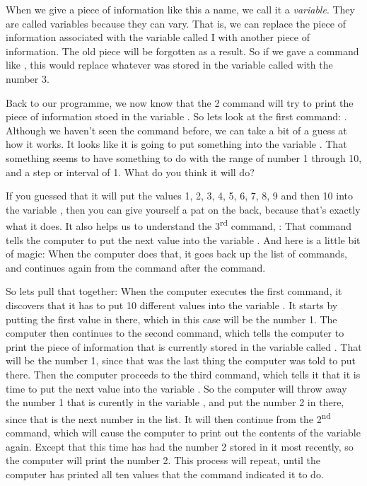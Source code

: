 When we give a piece of
information like this a name, we call it a {\em variable}.  They are called
variables because they can vary.  That is, we can replace the piece of information associated
with the variable called I with another piece of information.  The old piece will be forgotten
as a result.  So if we gave a command like , this would replace whatever was stored
in the variable called  with the number 3.

Back to our programme, we now know that the 2 command will try to print the piece of information
stoed in the variable .  So lets look at the first command: .  Although
we haven't seen the  command before, we can take a bit of a guess at how it works. It looks like
it is going to put something into the variable .  That something seems to have something to do
with the range of number 1 through 10, and a step or interval of 1.  What do you think it will do?

If you guessed
that it will put the values 1, 2, 3, 4, 5, 6, 7, 8, 9 and then 10 into the variable , then you
can give yourself a pat on the back, because that's exactly what it does.  It also helps us to
understand the 3\textsuperscript{rd} command, : That command tells the computer to put the next value into
the variable .  And here is a little bit of magic: When the computer does that, it goes back
up the list of commands, and continues again from the command after the  command.

So lets pull that together: When the computer executes the first command, it discovers that it has
to put 10 different values into the variable . It starts by putting the first value in there, which
in this case will be the number 1.
The computer then continues to the second command, which tells the computer to print the piece of
information that is currently stored in the variable called . That will be the number 1, since
that was the last thing the computer was told to put there.  Then the computer proceeds to the
third command, which tells it that it is time to put the next value into the variable .  So the
computer will throw away the number 1 that is curently in the variable , and put the number 2 in
there, since that is the next number in the list.  It will then continue from the 2\textsuperscript{nd} command,
which will cause the computer to print out the contents of the variable  again.  Except that this
time  has had the number 2 stored in it most recently, so the computer will print the number 2.
This process will repeat, until the computer has printed all ten values that the  command
indicated it to do.   

